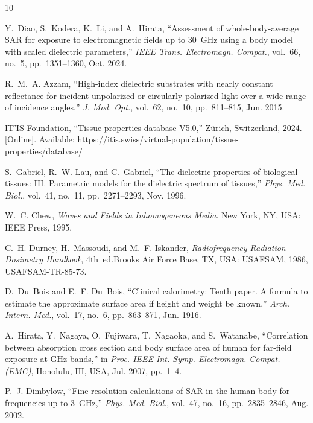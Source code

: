 \documentclass[journal,twocolumn,10pt]{IEEEtran}
\theoremstyle{plain}
\theoremstyle{remark}
\begin{document}
\begin{thebibliography}{10}
\providecommand{\url}[1]{#1}

Y.~Diao, S.~Kodera, K.~Li, and A.~Hirata, ``Assessment of
  whole-body-average SAR for exposure to electromagnetic fields up to
  30~GHz using a body model with scaled dielectric parameters,''
  \emph{IEEE Trans. Electromagn. Compat.}, vol.~66, no.~5,
  pp.~1351--1360, Oct. 2024.

R.~M.~A. Azzam, ``High-index dielectric substrates with nearly constant
  reflectance for incident unpolarized or circularly polarized light over
  a wide range of incidence angles,'' \emph{J. Mod. Opt.}, vol.~62,
  no.~10, pp.~811--815, Jun. 2015.

IT'IS Foundation, ``Tissue properties database V5.0,'' Z\"urich,
  Switzerland, 2024. [Online]. Available:
  \url{https://itis.swiss/virtual-population/tissue-properties/database/}

S.~Gabriel, R.~W. Lau, and C.~Gabriel, ``The dielectric properties of
  biological tissues: III. Parametric models for the dielectric spectrum
  of tissues,'' \emph{Phys. Med. Biol.}, vol.~41, no.~11,
  pp.~2271--2293, Nov. 1996.

W.~C. Chew, \emph{Waves and Fields in Inhomogeneous Media}.\quad
  New York, NY, USA: IEEE Press, 1995.

C.~H. Durney, H.~Massoudi, and M.~F. Iskander, \emph{Radiofrequency
  Radiation Dosimetry Handbook}, 4th~ed.\quad Brooks Air Force Base,
  TX, USA: USAFSAM, 1986, USAFSAM-TR-85-73.

D.~Du~Bois and E.~F. Du~Bois, ``Clinical calorimetry: Tenth paper.
  A formula to estimate the approximate surface area if height and
  weight be known,'' \emph{Arch. Intern. Med.}, vol.~17, no.~6,
  pp.~863--871, Jun. 1916.

A.~Hirata, Y.~Nagaya, O.~Fujiwara, T.~Nagaoka, and S.~Watanabe,
  ``Correlation between absorption cross section and body surface area
  of human for far-field exposure at GHz bands,'' in \emph{Proc. IEEE
  Int. Symp. Electromagn. Compat. (EMC)}, Honolulu, HI, USA, Jul. 2007,
  pp.~1--4.

P.~J. Dimbylow, ``Fine resolution calculations of SAR in the human body
  for frequencies up to 3~GHz,'' \emph{Phys. Med. Biol.}, vol.~47,
  no.~16, pp.~2835--2846, Aug. 2002.

\end{thebibliography}
\end{document}
